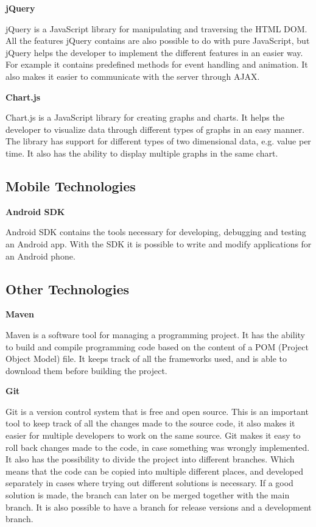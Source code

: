 \textbf{jQuery} \nocite{jQuery}

jQuery is a JavaScript library for manipulating and traversing the HTML DOM.
All the features jQuery contains are also possible to do with pure JavaScript, but jQuery helps the developer to implement the different features in an easier way.
For example it contains predefined methods for event handling and animation.
It also makes it easier to communicate with the server through AJAX.

\textbf{Chart.js} \nocite{Chartjs}

Chart.js is a JavaScript library for creating graphs and charts.
It helps the developer to visualize data through different types of graphs in an easy manner.
The library has support for different types of two dimensional data, e.g. value per time.
It also has the ability to display multiple graphs in the same chart.

\subsection{Mobile Technologies}

\textbf{Android SDK} \nocite{AndroidSDK}

Android SDK contains the tools necessary for developing, debugging and testing an Android app.
With the SDK it is possible to write and modify applications for an Android phone.

\subsection{Other Technologies}

\textbf{Maven} \nocite{Maven}

Maven is a software tool for managing a programming project.
It has the ability to build and compile programming code based on the content of a POM (Project Object Model) file.
It keeps track of all the frameworks used, and is able to download them before building the project.

\textbf{Git} \nocite{Git}

Git is a version control system that is free and open source.
This is an important tool to keep track of all the changes made to the source code, it also makes it easier for multiple developers to work on the same source.
Git makes it easy to roll back changes made to the code, in case something was wrongly implemented.
It also has the possibility to divide the project into different branches.
Which means that the code can be copied into multiple different places, and developed separately in cases where trying out different solutions is necessary.
If a good solution is made, the branch can later on be merged together with the main branch.
It is also possible to have a branch for release versions and a development branch.

